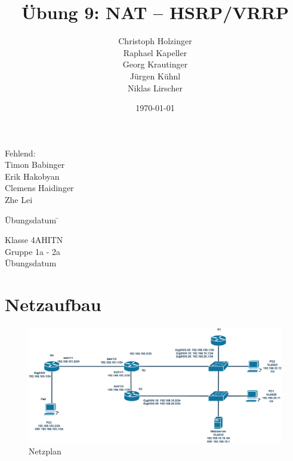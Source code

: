 \documentclass[a4paper, ngerman]{article}
\author{Christoph Holzinger \\Raphael Kapeller \\Georg Krautinger \\Jürgen Kühnl \\Niklas Lirscher }
\title{Übung 9: NAT – HSRP/VRRP}
\date{\origdate\today}
\begin{document}
\begin{titlingpage}

    \maketitle

    \vspace{60pt}

    \begin{center}
        Fehlend: \\
        Timon Babinger \\
        Erik Hakobyan \\
        Clemens Haidinger \\
        Zhe Lei
    \end{center}

    \vfill

    \vspace{-100pt}

    \begin{center}

        \begin{tabbing}

            Übungsdatum \quad \= \kill

            Klasse \> 4AHITN \\

            Gruppe \> 1a - 2a \\

            Übungsdatum \>  \\[20pt]

        \end{tabbing}

    \end{center}

\end{titlingpage}



\tableofcontents

\newpage

\section{Netzaufbau}

\begin{figure}[H]
    \centering
    \includegraphics[scale=0.32]{screenshots/netzplan.png}
    \caption{Netzplan}
\end{figure}
\end{document}
